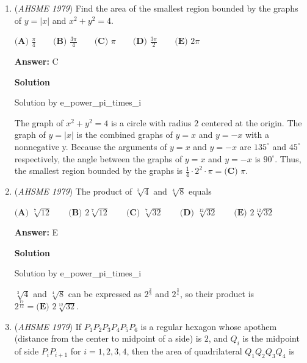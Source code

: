 \begin{enumerate}
 Since $x$ is a perfect square, denote $k$ such that $k^2 = x$. Then the next perfect square is $(k+1)^2 = k^2+2k+1$. Substituting back in the equation $k = \sqrt{x}$, the next square is $\boxed{\textbf{(E) }x+2\sqrt{x}+1}$.

 


	\item (\textit{AHSME 1979}) Find the area of the smallest region bounded by the graphs of $y=|x|$ and $x^2+y^2=4$.


 $\textbf{(A) }\frac{\pi}{4}\qquad \textbf{(B) }\frac{3\pi}{4}\qquad \textbf{(C) }\pi\qquad \textbf{(D) }\frac{3\pi}{2}\qquad \textbf{(E) }2\pi$

 \textbf{Answer: }C



\textbf{Solution}

Solution by e\_power\_pi\_times\_i

 The graph of $x^2+y^2 = 4$ is a circle with radius $2$ centered at the origin. The graph of $y=|x|$ is the combined graphs of $y=x$ and $y=-x$ with a nonnegative y. Because the arguments of $y=x$ and $y=-x$ are $135^\circ$ and $45^\circ$ respectively, the angle between the graphs of $y=x$ and $y=-x$ is $90^\circ$. Thus, the smallest region bounded by the graphs is $\frac{1}{4}\cdot2^2\cdot\pi = \boxed{\textbf{(C) } \pi}$.

 


	\item (\textit{AHSME 1979}) The product of $\sqrt[3]{4}$ and $\sqrt[4]{8}$ equals


 $\textbf{(A) }\sqrt[7]{12}\qquad \textbf{(B) }2\sqrt[7]{12}\qquad \textbf{(C) }\sqrt[7]{32}\qquad \textbf{(D) }\sqrt[12]{32}\qquad \textbf{(E) }2\sqrt[12]{32}$

 \textbf{Answer: }E



\textbf{Solution}

Solution by e\_power\_pi\_times\_i

 $\sqrt[3]{4}$ and $\sqrt[4]{8}$ can be expressed as $2^{\frac{2}{3}}$ and $2^{\frac{3}{4}}$, so their product is $2^{\frac{17}{12}} = \boxed{\textbf{(E) } 2\sqrt[12]{32}}$.

 


	\item (\textit{AHSME 1979}) If $P_1P_2P_3P_4P_5P_6$ is a regular hexagon whose apothem (distance from the center to midpoint of a side) is $2$, 
and $Q_i$ is the midpoint of side $P_iP_{i+1}$ for $i=1,2,3,4$, then the area of quadrilateral $Q_1Q_2Q_3Q_4$ is



\end{enumerate}
